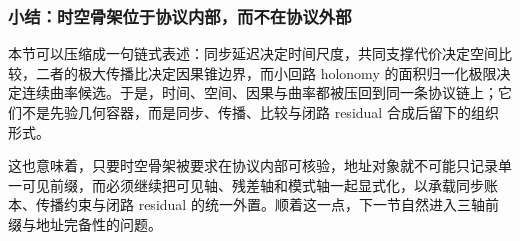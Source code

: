 \subsubsection{小结：时空骨架位于协议内部，而不在协议外部}\label{subsubsec:typed-address-biaxial-completion-sync-summary}
本节可以压缩成一句链式表述：同步延迟决定时间尺度，共同支撑代价决定空间比较，二者的极大传播比决定因果锥边界，而小回路 holonomy 的面积归一化极限决定连续曲率候选。于是，时间、空间、因果与曲率都被压回到同一条协议链上；它们不是先验几何容器，而是同步、传播、比较与闭路 residual 合成后留下的组织形式。

这也意味着，只要时空骨架被要求在协议内部可核验，地址对象就不可能只记录单一可见前缀，而必须继续把可见轴、残差轴和模式轴一起显式化，以承载同步账本、传播约束与闭路 residual 的统一外置。顺着这一点，下一节自然进入三轴前缀与地址完备性的问题。

